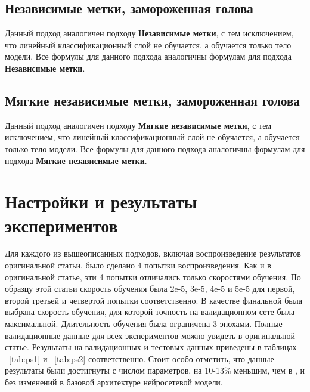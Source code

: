 \subsection{Независимые метки, замороженная голова}\label{subsec:ch3/sect3/sub7}

Данный подход аналогичен подходу \textbf{Независимые метки}, с тем исключением, что линейный классификационный слой не обучается, а обучается только тело модели. Все формулы для данного подхода аналогичны формулам для подхода \textbf{Независимые метки}.

\subsection{Мягкие независимые метки, замороженная голова}\label{subsec:ch3/sect3/sub8}

Данный подход аналогичен подходу \textbf{Мягкие независимые метки}, с тем исключением, что линейный классификационный слой не обучается, а обучается только тело модели. Все формулы для данного подхода аналогичны формулам для подхода \textbf{Мягкие независимые метки}.
\section{Настройки и результаты экспериментов}\label{sec:ch3/sect4}

Для каждого из вышеописанных подходов, включая воспроизведение результатов оригинальной статьи, было сделано 4 попытки воспроизведения. Как и в оригинальной статье, эти 4 попытки отличались только скоростями обучения. По образцу этой статьи скорость обучения была 2e-5, 3e-5, 4e-5 и 5e-5 для первой, второй третьей и четвертой попытки соответственно. В качестве финальной была выбрана скорость обучения, для которой точность на валидационном сете была максимальной. Длительность обучения была ограничена 3 эпохами. Полные валидационные данные для всех экспериментов можно увидеть в оригинальной статье.
Результаты на валидационных и тестовых данных приведены в таблицах ~\ref{tab:ps1} и ~\ref{tab:ps2} соответственно. Стоит особо отметить, что данные результаты были достигнуты с числом параметров, на 10-13\% меньшим, чем в \cite{stickland_2019}, и без изменений в базовой архитектуре нейросетевой модели.

